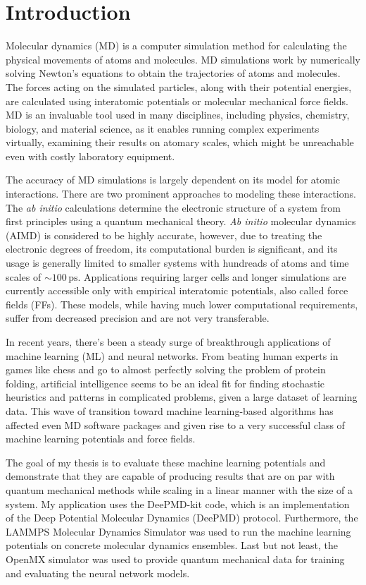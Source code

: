 \chapter{Introduction}

Molecular dynamics (MD) is a computer simulation method for calculating the
physical movements of atoms and molecules. MD simulations work by numerically
solving Newton's equations to obtain the trajectories of atoms and molecules.
The forces acting on the simulated particles, along with their potential
energies, are calculated using interatomic potentials or molecular mechanical
force fields. MD is an invaluable tool used in many disciplines, including
physics, chemistry, biology, and material science, as it enables running
complex experiments virtually, examining their results on atomary scales,
which might be unreachable even with costly laboratory equipment.

The accuracy of MD simulations is largely dependent on its model for atomic
interactions. There are two prominent approaches to modeling these
interactions. The \textit{ab initio} calculations determine the electronic
structure of a system from first principles using a quantum mechanical theory.
\textit{Ab initio} molecular dynamics (AIMD) is considered to be highly
accurate, however, due to treating the electronic degrees of freedom, its
computational burden is significant, and its usage is generally limited to
smaller systems with hundreads of atoms and time scales of
$\sim 100 \, \mathrm{ps}$. Applications requiring larger cells and longer
simulations are currently accessible only with empirical interatomic
potentials, also called force fields (FFs). These models, while having much
lower computational requirements, suffer from decreased precision and
are not very transferable.

In recent years, there's been a steady surge of breakthrough applications of
machine learning (ML) and neural networks. From beating human experts in
games like chess and go to almost perfectly solving the problem of protein
folding, artificial intelligence seems to be an ideal fit for finding
stochastic heuristics and patterns in complicated problems, given a large
dataset of learning data. This wave of transition toward machine
learning-based algorithms has affected even MD software packages and given
rise to a very successful class of machine learning potentials and force
fields.

The goal of my thesis is to evaluate these machine learning potentials and
demonstrate that they are capable of producing results that are on par with
quantum mechanical methods while scaling in a linear manner with the size of a
system. My application uses the DeePMD-kit code, which is an implementation of
the Deep Potential Molecular Dynamics (DeePMD) protocol. Furthermore, the
LAMMPS Molecular Dynamics Simulator was used to run the machine learning
potentials on concrete molecular dynamics ensembles. Last but not least, the
OpenMX simulator was used to provide quantum mechanical data for training and
evaluating the neural network models.

%
%
